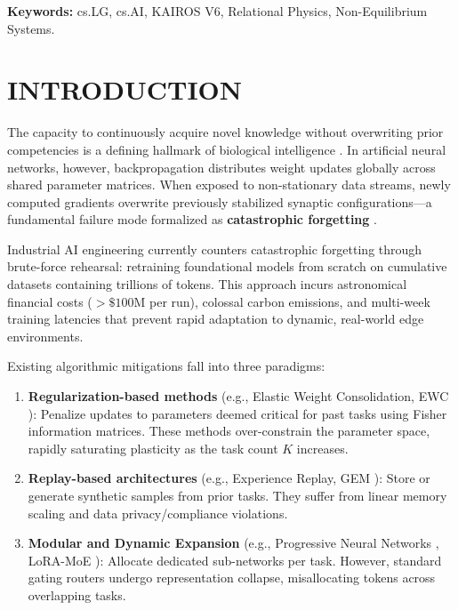 \documentclass[10pt,twocolumn]{article}
\begin{document}
\vspace{1em}
\noindent\textbf{Keywords:} cs.LG, cs.AI, KAIROS V6, Relational Physics, Non-Equilibrium Systems.

\vspace{1em}






\section{INTRODUCTION}

The capacity to continuously acquire novel knowledge without overwriting prior competencies is a defining hallmark of biological intelligence \cite{Parisi2019}. In artificial neural networks, however, backpropagation distributes weight updates globally across shared parameter matrices. When exposed to non-stationary data streams, newly computed gradients overwrite previously stabilized synaptic configurations—a fundamental failure mode formalized as \textbf{catastrophic forgetting} \cite{McCloskey1989, French1999}.

Industrial AI engineering currently counters catastrophic forgetting through brute-force rehearsal: retraining foundational models from scratch on cumulative datasets containing trillions of tokens. This approach incurs astronomical financial costs ($> \$100\text{M}$ per run), colossal carbon emissions, and multi-week training latencies that prevent rapid adaptation to dynamic, real-world edge environments.

Existing algorithmic mitigations fall into three paradigms:
\begin{enumerate}
  \item \textbf{Regularization-based methods} (e.g., Elastic Weight Consolidation, EWC \cite{Kirkpatrick2017}): Penalize updates to parameters deemed critical for past tasks using Fisher information matrices. These methods over-constrain the parameter space, rapidly saturating plasticity as the task count $K$ increases.
  \item \textbf{Replay-based architectures} (e.g., Experience Replay, GEM \cite{LopezPaz2017}): Store or generate synthetic samples from prior tasks. They suffer from linear memory scaling and data privacy/compliance violations.
  \item \textbf{Modular and Dynamic Expansion} (e.g., Progressive Neural Networks \cite{Rusu2016}, LoRA-MoE \cite{Hu2021}): Allocate dedicated sub-networks per task. However, standard gating routers undergo representation collapse, misallocating tokens across overlapping tasks.
\end{enumerate}
\end{document}
